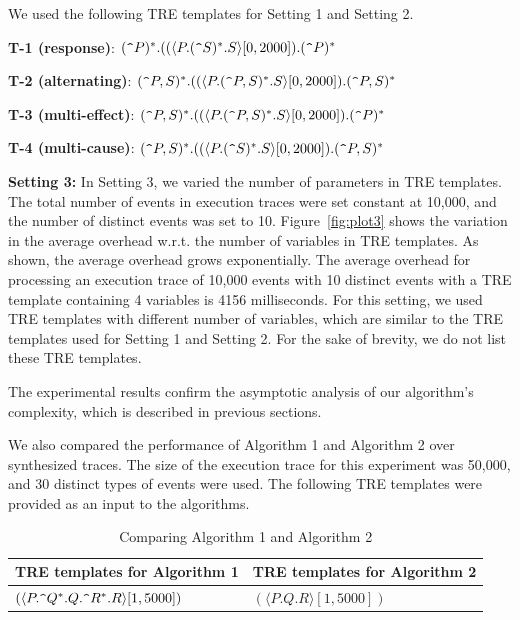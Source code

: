 \documentclass[]{sigplanconf}
\begin{document}
We used the following TRE templates for Setting 1 and Setting 2.

\noindent \textbf{T-1 (response)}: $(\verb!^!P)^*.((\langle P.(\verb!^!S)^*.S\rangle[0, 2000]).(\verb!^!P)^*$

\noindent \textbf{T-2 (alternating)}: $(\verb!^!P,S)^*.((\langle P.(\verb!^!P,S)^*.S\rangle[0, 2000]).(\verb!^!P,S)^*$

\noindent \textbf{T-3 (multi-effect)}: $(\verb!^!P,S)^*.((\langle P.(\verb!^!P,S)^*.S\rangle[0, 2000]).(\verb!^!P)^*$

\noindent \textbf{T-4 (multi-cause)}: $(\verb!^!P,S)^*.((\langle P.(\verb!^!S)^*.S\rangle[0, 2000]).(\verb!^!P,S)^*$

\noindent \textbf{Setting 3:}
In Setting 3, we varied the number of parameters in TRE templates. The total number of events in execution traces were set constant at 10,000, and the number of distinct events was set to 10. Figure~\ref{fig:plot3} shows the variation in the average overhead w.r.t. the number of variables in TRE templates. As shown, the average overhead grows exponentially. The average overhead for processing an execution trace of 10,000 events with 10 distinct events with a TRE template containing 4 variables is 4156 milliseconds. For this setting, we used TRE templates with different number of variables, which are similar to the TRE templates used for Setting 1 and Setting 2. For the sake of brevity, we do not list these TRE templates.

The experimental results confirm the asymptotic analysis of our algorithm's complexity, which is described in previous sections.

We also compared the performance of Algorithm 1 and Algorithm 2 over synthesized traces. The size of the execution trace for this experiment was 50,000, and 30 distinct types of events were used. The following TRE templates were provided as an input to the algorithms.

\begin{table}[t]
	\centering
	\begin{tabular}{|l|l|}
		\hline
		\textbf{TRE templates for Algorithm 1} & \textbf{TRE templates for Algorithm 2} \\
		\hline
		 $(\langle P.\verb!^!Q^*.Q.\verb!^!R^*.R \rangle [1, 5000])$& $(\langle P.Q.R \rangle [1, 5000])$ \\
	\end{tabular}

	\caption{Comparing Algorithm 1 and Algorithm 2}
	\label{miningOverhead}
\end{table}
\end{document}
